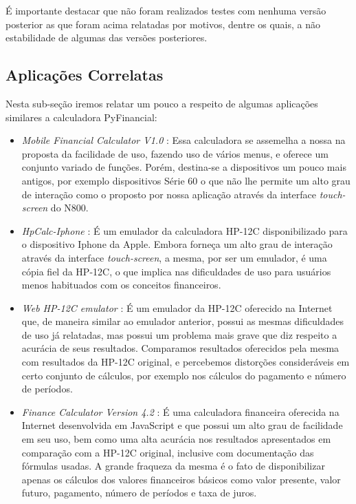 É importante destacar que não foram realizados testes com nenhuma versão posterior as que foram acima relatadas por motivos, dentre os quais, a não estabilidade de algumas das versões posteriores.


\subsection{Aplicações Correlatas}


Nesta sub-seção iremos relatar um pouco a respeito de algumas aplicações similares a calculadora PyFinancial:

\begin{itemize}

 \item \textit{Mobile Financial Calculator V1.0} \cite{mobcalc}: Essa calculadora se assemelha a nossa na proposta da facilidade de uso, fazendo uso de vários menus, e oferece um conjunto variado de funções. Porém, destina-se a dispositivos um pouco mais antigos, por exemplo dispositivos Série 60 \cite{s60} o que não lhe permite um alto grau de interação como o proposto por nossa aplicação através da interface \textit{touch-screen} do N800.

 \item \textit{HpCalc-Iphone} \cite{hpiphone}: É um emulador da calculadora HP-12C disponibilizado para o dispositivo Iphone da Apple. Embora forneça um alto grau de interação através da interface \textit{touch-screen}, a mesma, por ser um emulador, é uma cópia fiel da HP-12C, o que implica nas dificuldades de uso para usuários menos habituados com os conceitos financeiros.

 \item \textit{Web HP-12C emulator} \cite{epxcalc}: É um emulador da HP-12C oferecido na Internet que, de maneira similar ao emulador anterior, possui as mesmas dificuldades de uso já relatadas, mas possui um problema mais grave que diz respeito a acurácia de seus resultados. Comparamos resultados oferecidos pela mesma com resultados da HP-12C original, e percebemos distorções consideráveis em certo conjunto de cálculos, por exemplo nos cálculos do pagamento e número de períodos.

 \item \textit{Finance Calculator Version 4.2} \cite{arachnoid}: É uma calculadora financeira oferecida na Internet desenvolvida em JavaScript e que possui um alto grau de facilidade em seu uso, bem como uma alta acurácia nos resultados apresentados em comparação com a HP-12C original, inclusive com documentação das fórmulas usadas. A grande fraqueza da mesma é o fato de disponibilizar apenas os cálculos dos valores financeiros básicos como valor presente, valor futuro, pagamento, número de períodos e taxa de juros.

\end{itemize}

